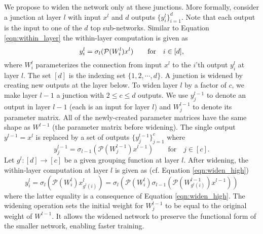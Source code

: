 \documentclass[10pt,twocolumn,letterpaper]{article}
\begin{document}
We propose to widen the network only at these junctions. More formally, consider a junction at layer $l$ with input $x^l$ and $d$ outputs $\{y^l_i\}_{i=1}^d$. Note that each output is the input to one of the $d$ top sub-networks. Similar to Equation \ref{eqn:within_layer} the within-layer computation is given as
\begin{equation}
\vspace{-1mm}
\label{eqn:widen_high}
y^l_i = \sigma_l(\mathcal{P}(W^l_i) x^l)  \quad\quad \mbox{for} \quad i \in [d],
\end{equation}
\noindent where $W^l_i$ parameterizes the connection from input $x^l$ to the $i$'th output $y^l_i$ at layer $l$. 
The set $[d]$ is the indexing set $\{1, 2, \cdots, d\}$. A junction is widened by creating new outputs at the layer below. To widen layer $l$ by a factor of $c$, we make layer $l-1$ a junction with $2 \leq c \leq d$ outputs. We use $y^{l-1}_j$ to denote an output in layer $l-1$ (each is an input for layer $l$) and $W^{l-1}_j$ to denote its parameter matrix. All of the newly-created parameter matrices have the same shape as $W^{l-1}$ (the parameter matrix before widening). The single output $y^{l-1}=x^l$ is replaced by a set of outputs $\{y^{l-1}_j\}_{j=1}^{c}$ where
\begin{equation}
\label{eqn:widen_low}
y_j^{l-1} = \sigma_{l-1} (\mathcal{P}(W^{l-1}_j) x^{l-1}) \quad\quad \mbox{for} \quad j \in [c].
\end{equation}
Let $g^l : [d] \to [c]$ be a given grouping function at layer $l$. After widening, the within-layer computation at layer $l$ is given as (cf. Equation \ref{eqn:widen_high})
\begin{equation}
\label{eqn:widened}
y_i^l = \sigma_l(\mathcal{P}(W^l_i) x^l_{g^l(i)}) = \sigma_{l}\left(\mathcal{P}(W^l_i) \sigma_{l-1}(\mathcal{P}(W^{l-1}_{g^l(i)}) x^{l-1})\right)
\end{equation}
\noindent where the latter equality is a consequence of Equation \ref{eqn:widen_high}. The widening operation sets the initial weight for $W^{l-1}_j$ to be equal to the original weight of $W^{l-1}$. It allows the widened network to preserve the functional form of the smaller network, enabling faster training.
\end{document}
